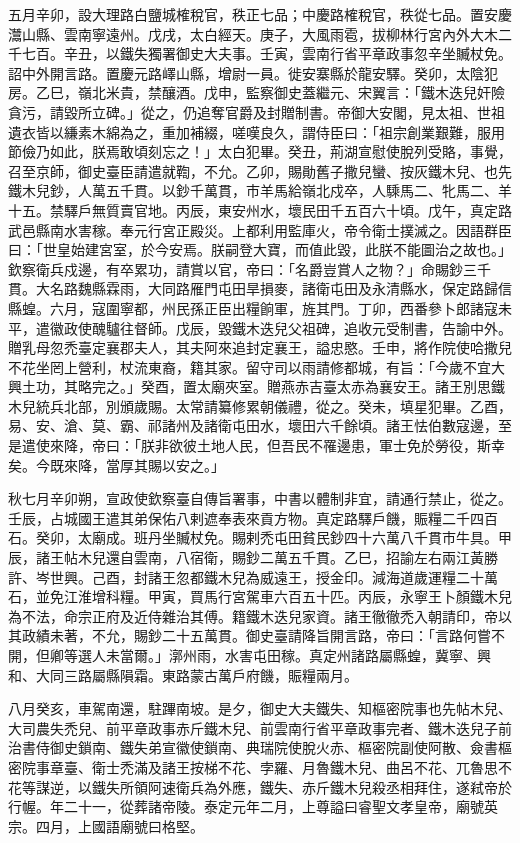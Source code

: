 \begin{pinyinscope}
 五月辛卯，設大理路白鹽城榷稅官，秩正七品；中慶路榷稅官，秩從七品。置安慶灊山縣、雲南寧遠州。戊戌，太白經天。庚子，大風雨雹，拔柳林行宮內外大木二千七百。辛丑，以鐵失獨署御史大夫事。壬寅，雲南行省平章政事忽辛坐贓杖免。詔中外開言路。置慶元路嶧山縣，增尉一員。徙安寨縣於龍安驛。癸卯，太陰犯房。乙巳，嶺北米貴，禁釀酒。戊申，監察御史蓋繼元、宋翼言：「鐵木迭兒奸險貪污，請毀所立碑。」從之，仍追奪官爵及封贈制書。帝御大安閣，見太祖、世祖遺衣皆以縑素木綿為之，重加補綴，嗟嘆良久，謂侍臣曰：「祖宗創業艱難，服用節儉乃如此，朕焉敢頃刻忘之！」太白犯畢。癸丑，荊湖宣慰使脫列受賂，事覺，召至京師，御史臺臣請遣就鞫，不允。乙卯，賜勛舊子撒兒蠻、按灰鐵木兒、也先鐵木兒鈔，人萬五千貫。以鈔千萬貫，市羊馬給嶺北戍卒，人騬馬二、牝馬二、羊十五。禁驛戶無質賣官地。丙辰，東安州水，壞民田千五百六十頃。戊午，真定路武邑縣南水害稼。奉元行宮正殿災。上都利用監庫火，帝令衛士撲滅之。因語群臣曰：「世皇始建宮室，於今安焉。朕嗣登大寶，而值此毀，此朕不能圖治之故也。」欽察衛兵戍邊，有卒累功，請賞以官，帝曰：「名爵豈賞人之物？」命賜鈔三千貫。大名路魏縣霖雨，大同路雁門屯田旱損麥，諸衛屯田及永清縣水，保定路歸信縣蝗。六月，寇圍寧都，州民孫正臣出糧餉軍，旌其門。丁卯，西番參卜郎諸寇未平，遣徽政使醜驢往督師。戊辰，毀鐵木迭兒父祖碑，追收元受制書，告諭中外。贈乳母忽禿臺定襄郡夫人，其夫阿來追封定襄王，謚忠愍。壬申，將作院使哈撒兒不花坐罔上營利，杖流東裔，籍其家。留守司以雨請修都城，有旨：「今歲不宜大興土功，其略完之。」癸酉，置太廟夾室。贈燕赤吉臺太赤為襄安王。諸王別思鐵木兒統兵北部，別頒歲賜。太常請纂修累朝儀禮，從之。癸未，填星犯畢。乙酉，易、安、滄、莫、霸、祁諸州及諸衛屯田水，壞田六千餘頃。諸王怯伯數寇邊，至是遣使來降，帝曰：「朕非欲彼土地人民，但吾民不罹邊患，軍士免於勞役，斯幸矣。今既來降，當厚其賜以安之。」



 秋七月辛卯朔，宣政使欽察臺自傳旨署事，中書以體制非宜，請通行禁止，從之。壬辰，占城國王遣其弟保佑八剌遮奉表來貢方物。真定路驛戶饑，賑糧二千四百石。癸卯，太廟成。班丹坐贓杖免。賜剌禿屯田貧民鈔四十六萬八千貫市牛具。甲辰，諸王帖木兒還自雲南，八宿衛，賜鈔二萬五千貫。乙巳，招諭左右兩江黃勝許、岑世興。己酉，封諸王忽都鐵木兒為威遠王，授金印。減海道歲運糧二十萬石，並免江淮增科糧。甲寅，買馬行宮駕車六百五十匹。丙辰，永寧王卜顏鐵木兒為不法，命宗正府及近侍雜治其傅。籍鐵木迭兒家資。諸王徹徹禿入朝請印，帝以其政績未著，不允，賜鈔二十五萬貫。御史臺請降旨開言路，帝曰：「言路何嘗不開，但卿等選人未當爾。」漷州雨，水害屯田稼。真定州諸路屬縣蝗，冀寧、興和、大同三路屬縣隕霜。東路蒙古萬戶府饑，賑糧兩月。



 八月癸亥，車駕南還，駐蹕南坡。是夕，御史大夫鐵失、知樞密院事也先帖木兒、大司農失禿兒、前平章政事赤斤鐵木兒、前雲南行省平章政事完者、鐵木迭兒子前治書侍御史鎖南、鐵失弟宣徽使鎖南、典瑞院使脫火赤、樞密院副使阿散、僉書樞密院事章臺、衛士禿滿及諸王按梯不花、孛羅、月魯鐵木兒、曲呂不花、兀魯思不花等謀逆，以鐵失所領阿速衛兵為外應，鐵失、赤斤鐵木兒殺丞相拜住，遂弒帝於行幄。年二十一，從葬諸帝陵。泰定元年二月，上尊謚曰睿聖文孝皇帝，廟號英宗。四月，上國語廟號曰格堅。




\end{pinyinscope}
